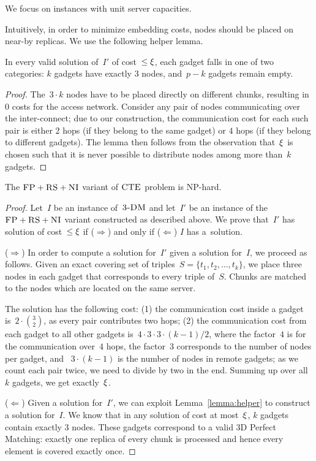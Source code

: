 We focus on instances with unit server capacities.

Intuitively, in order to minimize embedding costs,
nodes should be placed on near-by replicas. We use the following
helper lemma.
\begin{lemma}\label{lemma:helper}
In every valid solution of~$I'$ of cost~$\leq \xi$, each gadget
falls in one of two categories:
$k$ gadgets have exactly
$3$ nodes, and~$p-k$ gadgets remain empty.
\end{lemma}
\begin{proof}
The~$3\cdot k$ nodes have to be placed
directly on different chunks, resulting in 0 costs for the access network.
Consider any pair of nodes
communicating over the
inter-connect; due to our construction, the communication cost
for each such pair is either
$2$ hops (if they belong to the same gadget) or $4$ hops (if they belong
to different gadgets).
The lemma then follows from the observation that~$\xi$
is chosen such that it is never possible to distribute nodes
among more than~$k$ gadgets.
\end{proof}

\begin{theorem}
\label{theorem:fp_rs_cc}
The $\textsc{FP}+\textsc{RS}+\textsc{NI}$ variant of $\textsc{CTE}$ problem is NP-hard.
\end{theorem}
\begin{proof}
Let~$I$ be an instance of~$\textsc{3-DM}$ and let~$I'$ be an instance of
the~$\textsc{FP}+\textsc{RS}+\textsc{NI}$ variant constructed as described above.
We prove that~$I'$ has solution of cost~$\leq \xi$ if ($\Rightarrow$) and only if
($\Leftarrow$)
$I$ has a~solution.

($\Rightarrow$) In order to compute a solution
for~$I'$ given a solution for~$I$, we proceed as follows.
Given an exact covering set of triples~$S = \{t_1, t_2,
\ldots, t_k\}$, we place three nodes in each gadget that
corresponds to every triple of~$S$. Chunks are matched to the nodes which are located
on the same server.

The solution has the following cost:
(1) the communication cost inside a gadget is~$2 \cdot {3 \choose 2}$,
  as every pair contributes two hops;
  (2) the communication cost from each gadget to all other gadgets is~$4
  \cdot 3 \cdot 3 \cdot (k - 1) / 2$, where the factor~$4$ is
  for the
  communication over~$4$ hops, the factor~$3$
  corresponds to the number of nodes per gadget, and
 ~$3 \cdot (k-1)$ is the number of nodes in remote gadgets;
  as we count each pair twice, we need to divide by two in the end.
Summing up over all~$k$ gadgets, we get exactly~$\xi$.

($\Leftarrow$) Given a solution for~$I'$,
we can exploit Lemma~\ref{lemma:helper} to construct a solution for~$I$.
We know that in any solution of cost at most~$\xi$,
$k$ gadgets contain exactly 3 nodes. These gadgets correspond to a valid
3D Perfect Matching: exactly one replica of every chunk is processed and
hence every element is covered exactly once.
\end{proof}


